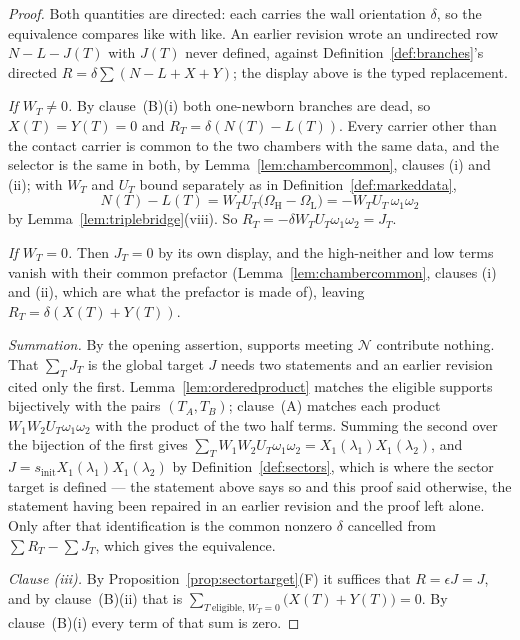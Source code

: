 \begin{proof}
Both quantities are directed: each carries the wall orientation $\delta$, so the
equivalence compares like with like. An earlier revision wrote an undirected row
$N-L-J(T)$ with $J(T)$ never defined, against Definition~\ref{def:branches}'s
directed $R=\delta\sum(N-L+X+Y)$; the display above is the typed replacement.

\emph{If $W_T\neq0$.} By clause~(B)(i) both one-newborn
branches are dead, so $X(T)=Y(T)=0$ and $R_T=\delta(N(T)-L(T))$. Every carrier
other than the contact carrier is common to the two chambers with the same data,
and the selector is the same in both, by
Lemma~\ref{lem:chambercommon}, clauses (i) and (ii); with $W_T$ and $U_T$ bound separately as in
Definition~\ref{def:markeddata},
\[
   N(T)-L(T)=W_TU_T\bigl(\Omega_{\mathrm H}-\Omega_{\mathrm L}\bigr)
   =-W_TU_T\,\omega_1\omega_2
\]
by Lemma~\ref{lem:triplebridge}(viii). So
$R_T=-\delta W_TU_T\omega_1\omega_2=J_T$.

\emph{If $W_T=0$.} Then $J_T=0$ by its own display, and the high-neither and low
terms vanish with their common prefactor
(Lemma~\ref{lem:chambercommon}, clauses (i) and (ii), which are what the
prefactor is made of), leaving $R_T=\delta(X(T)+Y(T))$.

\emph{Summation.} By the opening assertion, supports meeting $\mathcal N$
contribute nothing. That $\sum_TJ_T$ is the global target $J$ needs two
statements and an earlier revision cited only the first.
Lemma~\ref{lem:orderedproduct} matches the eligible supports bijectively with
the pairs $(T_A,T_B)$; clause~(A) matches each product
$W_1W_2U_T\omega_1\omega_2$ with the product of the two half terms. Summing the
second over the bijection of the first gives
$\sum_TW_1W_2U_T\omega_1\omega_2=X_1(\lambda_1)X_1(\lambda_2)$, and
$J=s_{\mathrm{init}}X_1(\lambda_1)X_1(\lambda_2)$ by
Definition~\ref{def:sectors}, which is where the sector target is defined --- the
statement above says so and this proof said otherwise, the statement having been
repaired in an earlier revision and the proof left alone. Only after that identification is the common
nonzero $\delta$ cancelled from $\sum R_T-\sum J_T$, which gives the
equivalence.


\emph{Clause (iii).}
By Proposition~\ref{prop:sectortarget}(F) it suffices that $R=\epsilon J=J$, and by clause~(B)(ii) that is
$\sum_{T\ \mathrm{eligible},\,W_T=0}\bigl(X(T)+Y(T)\bigr)=0$. By clause~(B)(i) every term of that sum is zero.


\end{proof}
